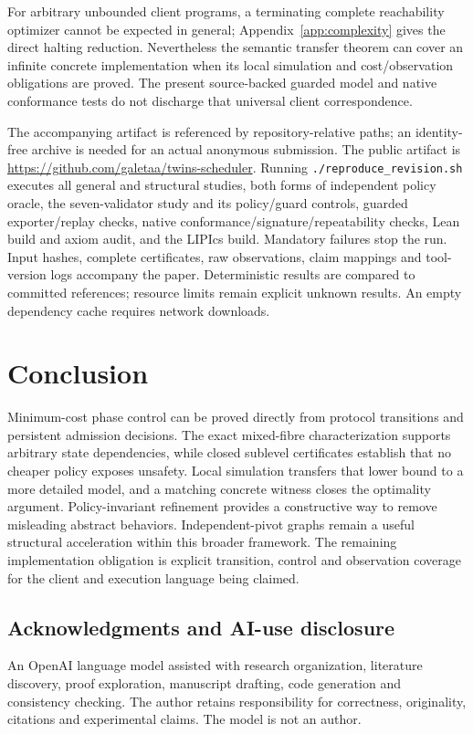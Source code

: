 For arbitrary unbounded client programs, a terminating complete
reachability optimizer cannot be expected in general;
Appendix~\ref{app:complexity} gives the direct halting reduction.
Nevertheless the semantic transfer theorem can cover an infinite
concrete implementation when its local simulation and cost/observation
obligations are proved. The present source-backed guarded model and
native conformance tests do not discharge that universal client
correspondence.

\ifdefined\TwinsAnonymous

The accompanying artifact is referenced by repository-relative paths; an
identity-free archive is needed for an actual anonymous submission.
\else The public artifact is
\url{https://github.com/galetaa/twins-scheduler}. \fi Running
\texttt{./reproduce\_revision.sh} executes all general and structural
studies, both forms of independent policy oracle, the seven-validator
study and its policy/guard controls, guarded exporter/replay checks,
native conformance/signature/repeatability checks, Lean build and axiom
audit, and the LIPIcs build. Mandatory failures stop the run. Input
hashes, complete certificates, raw observations, claim mappings and
tool-version logs accompany the paper. Deterministic results are
compared to committed references; resource limits remain explicit
unknown results. An empty dependency cache requires network downloads.

\section{Conclusion}\label{conclusion}

Minimum-cost phase control can be proved directly from protocol
transitions and persistent admission decisions. The exact mixed-fibre
characterization supports arbitrary state dependencies, while closed
sublevel certificates establish that no cheaper policy exposes unsafety.
Local simulation transfers that lower bound to a more detailed model,
and a matching concrete witness closes the optimality argument.
Policy-invariant refinement provides a constructive way to remove
misleading abstract behaviors. Independent-pivot graphs remain a useful
structural acceleration within this broader framework. The remaining
implementation obligation is explicit transition, control and
observation coverage for the client and execution language being
claimed.

\subsection{Acknowledgments and AI-use
disclosure}\label{acknowledgments-and-ai-use-disclosure}

An OpenAI language model assisted with research organization, literature
discovery, proof exploration, manuscript drafting, code generation and
consistency checking. The author retains responsibility for correctness,
originality, citations and experimental claims. The model is not an
author.
